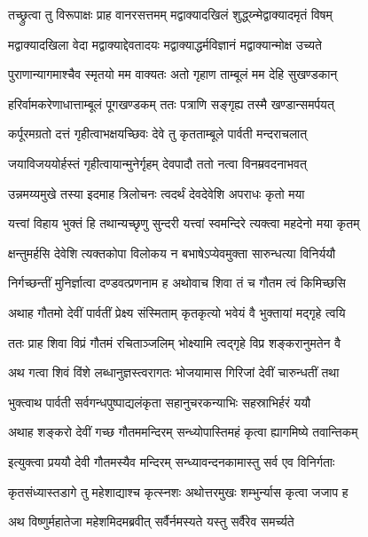 \twolineshloka
{तच्छ्रुत्वा तु विरूपाक्षः प्राह वानरसत्तमम्}
{मद्वाक्यादखिलं शुद्ध्य्न्मेद्वाक्यादमृतं विषम्}%

\twolineshloka
{मद्वाक्यादखिला वेदा मद्वाक्याद्देवतादयः}
{मद्वाक्याद्धर्मविज्ञानं मद्वाक्यान्मोक्ष उच्यते}%

\twolineshloka
{पुराणान्यागमाश्चैव स्मृतयो मम वाक्यतः}
{अतो गृहाण ताम्बूलं मम देहि सुखण्डकान्}%

\twolineshloka
{हरिर्वामकरेणाधात्ताम्बूलं पूगखण्डकम्}
{ततः पत्राणि सङ्गृह्य तस्मै खण्डान्समर्पयत्}%

\twolineshloka
{कर्पूरमग्रतो दत्तं गृहीत्वाभक्षयच्छिवः}
{देवे तु कृतताम्बूले पार्वती मन्दराचलात्}%

\twolineshloka
{जयाविजययोर्हस्तं गृहीत्वायान्मुनेर्गृहम्}
{देवपादौ ततो नत्वा विनम्रवदनाभवत्}%

\twolineshloka
{उन्नमय्यमुखे तस्या इदमाह त्रिलोचनः}
{त्वदर्थं देवदेवेशि अपराधः कृतो मया}%

\twolineshloka
{यत्त्वां विहाय भुक्तं हि तथान्यच्छृणु सुन्दरी}
{यत्त्वां स्वमन्दिरे त्यक्त्वा महदेनो मया कृतम्}%

\twolineshloka
{क्षन्तुमर्हसि देवेशि त्यक्तकोपा विलोकय}
{न बभाषेऽप्येवमुक्ता सारुन्धत्या विनिर्ययौ}%

\twolineshloka
{निर्गच्छन्तीं मुनिर्ज्ञात्वा दण्डवत्प्रणनाम ह}
{अथोवाच शिवा तं च गौतम त्वं किमिच्छसि}%

\twolineshloka
{अथाह गौतमो देवीं पार्वतीं प्रेक्ष्य संस्मिताम्}
{कृतकृत्यो भवेयं वै भुक्तायां मद्गृहे त्वयि}%

\twolineshloka
{ततः प्राह शिवा विप्रं गौतमं रचिताञ्जलिम्}
{भोक्ष्यामि त्वद्गृहे विप्र शङ्करानुमतेन वै}%

\twolineshloka
{अथ गत्वा शिवं विंशे लब्धानुज्ञस्त्वरागतः}
{भोजयामास गिरिजां देवीं चारुन्धतीं तथा}%

\twolineshloka
{भुक्त्वाथ पार्वती सर्वगन्धपुष्पाद्यलंकृता}
{सहानुचरकन्याभिः सहस्राभिर्हरं ययौ}%

\twolineshloka
{अथाह शङ्करो देवीं गच्छ गौतममन्दिरम्}
{सन्ध्योपास्तिमहं कृत्वा ह्यागमिष्ये तवान्तिकम्}%

\twolineshloka
{इत्युक्त्वा प्रययौ देवी गौतमस्यैव मन्दिरम्}
{सन्ध्यावन्दनकामास्तु सर्व एव विनिर्गताः}%

\twolineshloka
{कृतसंध्यास्तडागे तु महेशाद्याश्च कृत्स्नशः}
{अथोत्तरमुखः शम्भुर्न्यास कृत्वा जजाप ह}%

\twolineshloka
{अथ विष्णुर्महातेजा महेशमिदमब्रवीत्}
{सर्वैर्नमस्यते यस्तु सर्वैरेव समर्च्यते}%

